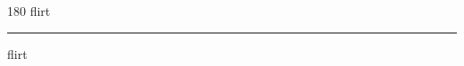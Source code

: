 
\begin{frame}
\begin{center}
\begin{turn}{180}
{\fontsize{2.5cm}{1em}\selectfont flirt}
\end{turn}
\vspace{1em}\par  
\hrule
\vspace{1em}\par  
{\fontsize{2.5cm}{1em}\selectfont flirt}
\end{center}
\end{frame}
